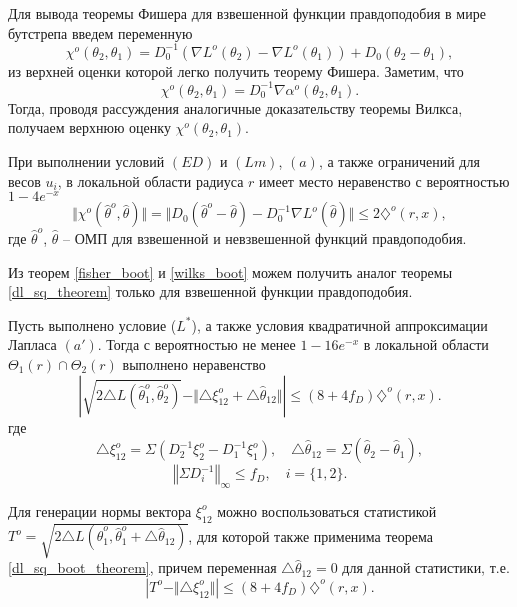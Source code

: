 Для вывода теоремы Фишера для взвешенной функции правдоподобия в мире бутстрепа введем переменную
\[
\chi^{o}(\theta_2, \theta_1) =  D_0^{-1} ( \nabla L^{o}(\theta_2) -   \nabla L^{o}(\theta_1) ) + D_0 (\theta_2-  \theta_1),
\] 
из верхней оценки которой легко получить теорему Фишера. Заметим, что
\[
\chi^{o}(\theta_2, \theta_1) = D_0^{-1} \nabla \alpha^{o}(\theta_2, \theta_1). 
\]
Тогда, проводя рассуждения аналогичные доказательству теоремы Вилкса, получаем верхнюю оценку $\chi^{o}(\theta_2, \theta_1)$.

\begin{theorem}
\label{fisher_boot}
При выполнении условий $(ED)$ и $(Lm)$, $(a)$, а также ограничений для весов $u_i$, в локальной области радиуса $r$ имеет место неравенство с вероятностью $1 - 4 e^{-x}$
\[
\Vert \chi^{o}(\widehat{\theta}^{o}, \widehat{\theta}) \Vert
= 
\Vert  D_0 (\widehat{\theta}^{o} -  \widehat{\theta}) -  D_0^{-1} \nabla L^{o}(\widehat{\theta}) \Vert
\leq 
 2 \diamondsuit^{o}(r,x), 
\] 
где $\widehat{\theta}^{o}$, $\widehat{\theta}$ -- ОМП для взвешенной и невзвешенной функций правдоподобия.  
\end{theorem}

Из теорем \ref{fisher_boot} и \ref{wilks_boot} можем получить аналог теоремы \ref{dl_sq_theorem} только для взвешенной функции правдоподобия.

\begin{theorem}
\label{dl_sq_boot_theorem}

Пусть выполнено условие ($L^*$), а также условия квадратичной аппроксимации  Лапласа $(a')$. Тогда с вероятностью не менее $1 - 16 e^{-x}$ в локальной области $\Theta_1(r) \cap \Theta_2(r)$ выполнено неравенство
\[
\left| 
\sqrt{ 2\triangle L (\widehat{\theta}_1^{o}, \widehat{\theta}_2^{o}) } - 
\Vert \triangle \xi_{12}^{o} + \triangle \widehat{\theta}_{12} \Vert 
\right| \leq 
(8 + 4 f_D)  \diamondsuit^{o} (r, x).
\]
где
\[
\triangle \xi_{12}^{o}  = \Sigma (D_2^{-1} \xi_2^{o} - D_1^{-1} \xi_1^{o}),
\quad
\triangle \widehat{\theta}_{12}  = \Sigma (\widehat{\theta}_2 - \widehat{\theta}_1), 
\]
\[
\left\Vert  \Sigma D^{-1}_i  \right\Vert_{\infty} \leq f_D, 
\quad i = \{1,2\}.
\]

\end{theorem}

\begin{remark}
Для генерации нормы вектора $\xi_{12}^{o}$ можно воспользоваться статистикой $T^{o} = \sqrt{ 2\triangle L (\widehat{\theta}_1^{o}, \widehat{\theta}_1^{o} + \triangle \widehat{\theta}_{12})} $, для которой также применима теорема 
\ref{dl_sq_boot_theorem}, причем переменная $\triangle \widehat{\theta}_{12}  = 0$ для данной статистики, т.е.
\[
\left| 
T^{o} - 
\Vert \triangle \xi_{12}^{o}  \Vert 
\right| \leq 
(8 + 4 f_D)  \diamondsuit^{o} (r, x).
\]
\end{remark}

